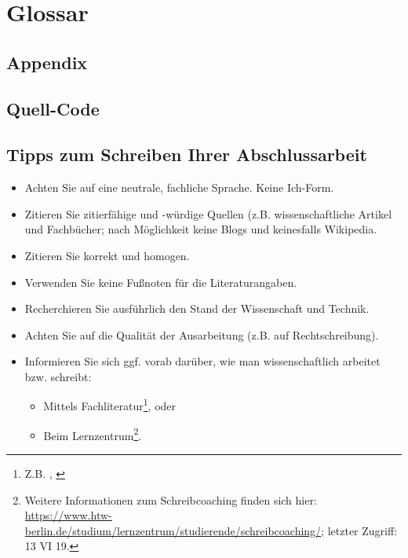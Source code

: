 \documentclass[oneside,bibliography=totocnumbered,BCOR=5mm]{scrbook}
\begin{document}
% 
% 
\printbibliography[
heading=bibintoc,
title={Quellenverzeichnis}
]

\newpage
\chapter{Glossar}
\begin{appendix}
\chapter{Appendix}

\section{Quell-Code}

\section{Tipps zum Schreiben Ihrer Abschlussarbeit}

\begin{itemize}
\item Achten Sie auf eine neutrale, fachliche Sprache. Keine \glqq{}Ich\grqq{}-Form.
\item Zitieren Sie zitierf\"ahige und -w\"urdige Quellen (z.B. wissenschaftliche Artikel und Fachb\"ucher; nach M\"oglichkeit keine Blogs und keinesfalls Wikipedia.
\item Zitieren Sie korrekt und homogen.
\item Verwenden Sie keine Fu{\ss}noten f\"ur die Literaturangaben.
\item Recherchieren Sie ausf\"uhrlich den Stand der Wissenschaft und Technik.
\item Achten Sie auf die Qualit\"at der Ausarbeitung (z.B. auf Rechtschreibung).
\item Informieren Sie sich ggf. vorab dar\"uber, wie man wissenschaftlich arbeitet bzw. schreibt:
\begin{itemize}
\item Mittels Fachliteratur\footnote{Z.B. \autocite{balzert2011}, \autocite{franck2013}}, oder
\item Beim Lernzentrum\footnote{Weitere Informationen zum Schreibcoaching finden sich hier: \url{https://www.htw-berlin.de/studium/lernzentrum/studierende/schreibcoaching/}; letzter Zugriff: 13 VI 19.}.
\end{itemize}
\end{itemize}


\end{appendix}
\end{document}

